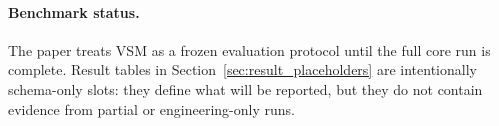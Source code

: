 

\paragraph{Benchmark status.}
The paper treats VSM as a frozen evaluation protocol until the full core run is complete. Result tables in Section~\ref{sec:result_placeholders} are intentionally schema-only slots: they define what will be reported, but they do not contain evidence from partial or engineering-only runs.
